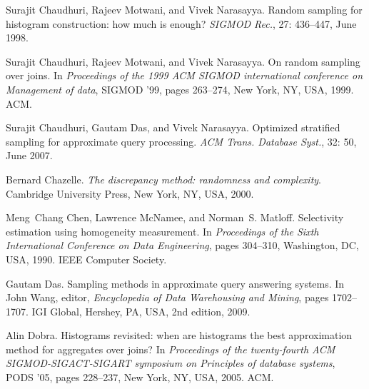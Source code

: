 \begin{thebibliography}{67}
Surajit Chaudhuri, Rajeev Motwani, and Vivek Narasayya.
\newblock Random sampling for histogram construction: how much is enough?
\newblock \emph{SIGMOD Rec.}, 27: 436--447, June 1998.

Surajit Chaudhuri, Rajeev Motwani, and Vivek Narasayya.
\newblock On random sampling over joins.
\newblock In \emph{Proceedings of the 1999 ACM SIGMOD international conference
  on Management of data}, SIGMOD '99, pages 263--274, New York, NY, USA, 1999.
  ACM.

Surajit Chaudhuri, Gautam Das, and Vivek Narasayya.
\newblock Optimized stratified sampling for approximate query processing.
\newblock \emph{ACM Trans. Database Syst.}, 32: 50, June 2007.

Bernard Chazelle.
\newblock \emph{The discrepancy method: randomness and complexity}.
\newblock Cambridge University Press, New York, NY, USA, 2000.

Meng~Chang Chen, Lawrence McNamee, and Norman~S. Matloff.
\newblock Selectivity estimation using homogeneity measurement.
\newblock In \emph{Proceedings of the Sixth International Conference on Data
  Engineering}, pages 304--310, Washington, DC, USA, 1990. IEEE Computer
  Society.

Gautam Das.
\newblock Sampling methods in approximate query answering systems.
\newblock In John Wang, editor, \emph{Encyclopedia of Data Warehousing and
  Mining}, pages 1702--1707. IGI Global, Hershey, PA, USA, 2nd edition, 2009.

Alin Dobra.
\newblock Histograms revisited: when are histograms the best approximation
  method for aggregates over joins?
\newblock In \emph{Proceedings of the twenty-fourth ACM SIGMOD-SIGACT-SIGART
  symposium on Principles of database systems}, PODS '05, pages 228--237, New
  York, NY, USA, 2005. ACM.


\end{thebibliography}
